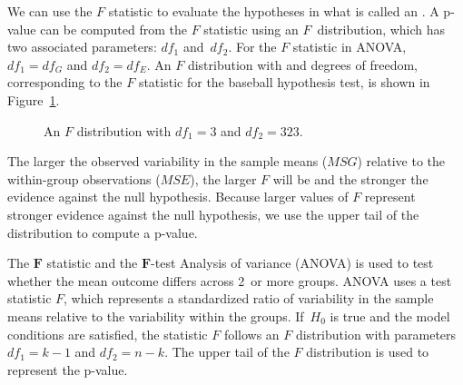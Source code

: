 We can use the $F$ statistic to evaluate the hypotheses in
what is called an .
A p-value can be computed from the $F$ statistic using
an $F$~distribution, which has two associated parameters:
$df_{1}$ and~$df_{2}$.
For the $F$ statistic in ANOVA,
$df_{1} = df_{G}$ and $df_{2} = df_{E}$.
An $F$ distribution with \mlbDFA{} and \mlbDFB{} degrees
of freedom, corresponding to the $F$ statistic for the
baseball hypothesis test, is shown in
Figure~\ref{fDist2And423Shaded}.

\begin{figure}[h]
  \centering
  \caption{An $F$ distribution with $df_1=3$ and $df_2=323$.}
  \label{fDist2And423Shaded}
\end{figure}

\D{\newpage}

The larger the observed variability in the sample
means ($MSG$) relative to the within-group observations ($MSE$),
the larger $F$ will be and the stronger the evidence against
the null hypothesis.
Because larger values of $F$ represent stronger evidence against
the null hypothesis, we use the upper tail of the distribution
to compute a p-value.

\begin{onebox}{The $\pmb{F}$ statistic and the
    $\pmb{F}$-test}
  Analysis of variance (ANOVA) is used to test whether
  the mean outcome differs across 2~or more groups.
  ANOVA uses a test statistic $F$, which represents
  a standardized ratio of variability in the sample means
  relative to the variability within the groups.
  If~$H_0$ is true and the model conditions are satisfied,
  the statistic $F$ follows an $F$ distribution with
  parameters $df_{1} = k - 1$ and $df_{2} = n - k$.
  The upper tail of the $F$ distribution is used to
  represent the p-value.
\end{onebox}


